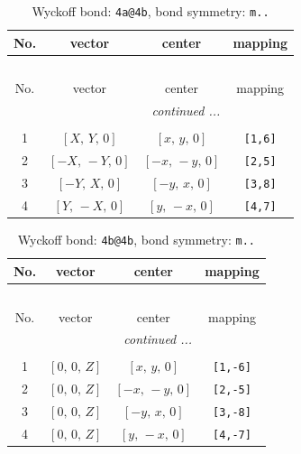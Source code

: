 \documentclass[fleqn,8pt]{jsarticle}
\begin{document}
\begin{longtable}{cccc}
\caption{Wyckoff bond: {\tt 4a@4b}, bond symmetry: {\tt m..}}
 \\
 \hline \hline
No. & vector & center & mapping \\ \hline \endfirsthead

\multicolumn{3}{l}{\tablename\ \thetable{}} \\
 \hline \hline
No. & vector & center & mapping \\ \hline \endhead

 \hline \hline
\multicolumn{3}{r}{\footnotesize\it continued ...} \\ \endfoot

 \hline \hline
\multicolumn{3}{r}{} \\ \endlastfoot

1 & $\left[ X,\, Y,\, 0 \right]$ & $\left[ x,\, y,\, 0 \right]$ & {\tt [1,6]} \\ \hline
2 & $\left[ - X,\, - Y,\, 0 \right]$ & $\left[ - x,\, - y,\, 0 \right]$ & {\tt [2,5]} \\ \hline
3 & $\left[ - Y,\, X,\, 0 \right]$ & $\left[ - y,\, x,\, 0 \right]$ & {\tt [3,8]} \\ \hline
4 & $\left[ Y,\, - X,\, 0 \right]$ & $\left[ y,\, - x,\, 0 \right]$ & {\tt [4,7]} \\
\end{longtable}
\renewcommand{\arraystretch}{1.2}
\begin{longtable}{cccc}
\caption{Wyckoff bond: {\tt 4b@4b}, bond symmetry: {\tt m..}}
 \\
 \hline \hline
No. & vector & center & mapping \\ \hline \endfirsthead

\multicolumn{3}{l}{\tablename\ \thetable{}} \\
 \hline \hline
No. & vector & center & mapping \\ \hline \endhead

 \hline \hline
\multicolumn{3}{r}{\footnotesize\it continued ...} \\ \endfoot

 \hline \hline
\multicolumn{3}{r}{} \\ \endlastfoot

1 & $\left[ 0,\, 0,\, Z \right]$ & $\left[ x,\, y,\, 0 \right]$ & {\tt [1,-6]} \\ \hline
2 & $\left[ 0,\, 0,\, Z \right]$ & $\left[ - x,\, - y,\, 0 \right]$ & {\tt [2,-5]} \\ \hline
3 & $\left[ 0,\, 0,\, Z \right]$ & $\left[ - y,\, x,\, 0 \right]$ & {\tt [3,-8]} \\ \hline
4 & $\left[ 0,\, 0,\, Z \right]$ & $\left[ y,\, - x,\, 0 \right]$ & {\tt [4,-7]} \\
\end{longtable}
\end{document}
